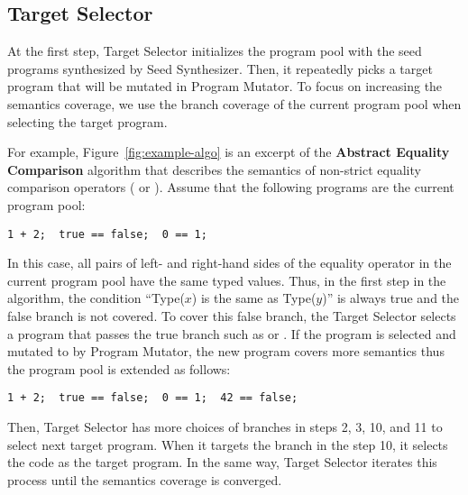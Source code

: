 \subsection{Target Selector}

At the first step, \textsf{Target Selector} initializes the program pool with
the seed programs synthesized by \textsf{Seed Synthesizer}.  Then, it repeatedly
picks a target program that will be mutated in \textsf{Program Mutator}.  To
focus on increasing the semantics coverage, we use the branch coverage
of the current program pool when selecting the target program.

For example, Figure~\ref{fig:example-algo} is an excerpt of the \textbf{Abstract
Equality Comparison} algorithm that describes the semantics of non-strict
equality comparison operators (\code{==} or \code{\!=}).  Assume that the
following programs are the current program pool:
\begin{lstlisting}[style=myJSstyle]
1 + 2;  true == false;  0 == 1;
\end{lstlisting}
In this case, all pairs of left- and right-hand sides of the equality operator
in the current program pool have the same typed values.  Thus, in the first step
in the algorithm, the condition ``Type($x$) is the same as Type($y$)'' is always
true and the false branch is not covered.  To cover this false branch, the
\textsf{Target Selector} selects a program that passes the true branch such as
 or .  If the program  is
selected and mutated to  by \textsf{Program Mutator}, the
new program covers more semantics thus the program pool is extended as follows:
\begin{lstlisting}[style=myJSstyle]
1 + 2;  true == false;  0 == 1;  42 == false;
\end{lstlisting}
Then, \textsf{Target Selector} has more choices of branches in steps 2, 3, 10,
and 11 to select next target program.  When it targets the branch in the step
10, it selects the code  as the target program.  In the same
way, \textsf{Target Selector} iterates this process until the semantics coverage
is converged.
